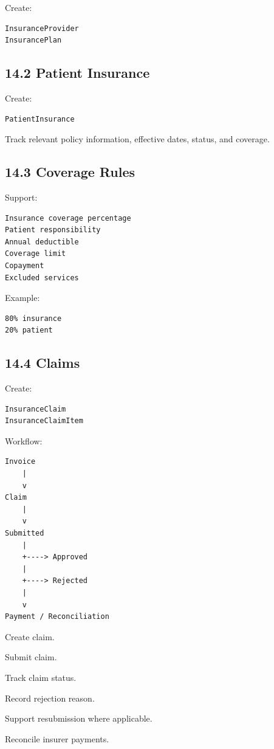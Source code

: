 \documentclass[11pt,a4paper]{article}
\newcommand{\task}[1]{\item[$\square$] #1}
\begin{document}
Create:

\begin{lstlisting}
InsuranceProvider
InsurancePlan
\end{lstlisting}

\subsection{14.2 Patient Insurance}

Create:

\begin{lstlisting}
PatientInsurance
\end{lstlisting}

Track relevant policy information, effective dates, status, and coverage.

\subsection{14.3 Coverage Rules}

Support:

\begin{lstlisting}
Insurance coverage percentage
Patient responsibility
Annual deductible
Coverage limit
Copayment
Excluded services
\end{lstlisting}

Example:

\begin{lstlisting}
80% insurance
20% patient
\end{lstlisting}

\subsection{14.4 Claims}

Create:

\begin{lstlisting}
InsuranceClaim
InsuranceClaimItem
\end{lstlisting}

Workflow:

\begin{lstlisting}
Invoice
    |
    v
Claim
    |
    v
Submitted
    |
    +----> Approved
    |
    +----> Rejected
    |
    v
Payment / Reconciliation
\end{lstlisting}

\task{Create claim.}
\task{Submit claim.}
\task{Track claim status.}
\task{Record rejection reason.}
\task{Support resubmission where applicable.}
\task{Reconcile insurer payments.}
\end{document}
